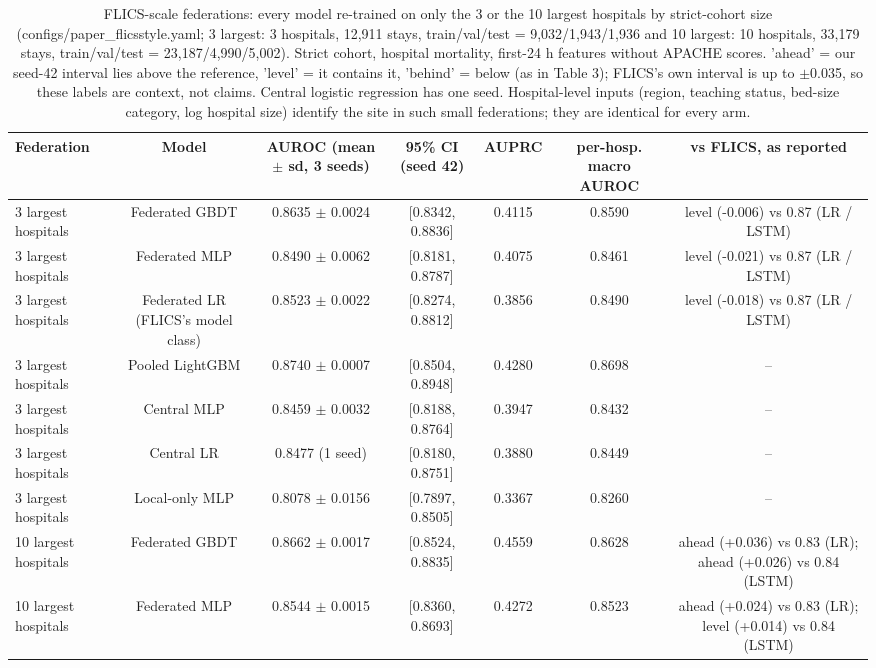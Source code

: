 \begin{table}[t]
\centering\small
\caption{FLICS-scale federations: every model re-trained on only the 3 or the 10 largest hospitals by strict-cohort size (configs/paper\_flicsstyle.yaml; 3 largest: 3 hospitals, 12,911 stays, train/val/test = 9,032/1,943/1,936 and 10 largest: 10 hospitals, 33,179 stays, train/val/test = 23,187/4,990/5,002). Strict cohort, hospital mortality, first-24 h features without APACHE scores. 'ahead' = our seed-42 interval lies above the reference, 'level' = it contains it, 'behind' = below (as in Table 3); FLICS's own interval is up to $\pm$0.035, so these labels are context, not claims. Central logistic regression has one seed. Hospital-level inputs (region, teaching status, bed-size category, log hospital size) identify the site in such small federations; they are identical for every arm.}\label{tab:flicsscale}
\begin{tabular}{lcccccc}
\toprule
Federation & Model & AUROC (mean $\pm$ sd, 3 seeds) & 95\% CI (seed 42) & AUPRC & per-hosp. macro AUROC & vs FLICS, as reported \\
\midrule
3 largest hospitals & Federated GBDT & 0.8635 $\pm$ 0.0024 & [0.8342, 0.8836] & 0.4115 & 0.8590 & level (-0.006) vs 0.87 (LR / LSTM) \\
3 largest hospitals & Federated MLP & 0.8490 $\pm$ 0.0062 & [0.8181, 0.8787] & 0.4075 & 0.8461 & level (-0.021) vs 0.87 (LR / LSTM) \\
3 largest hospitals & Federated LR (FLICS's model class) & 0.8523 $\pm$ 0.0022 & [0.8274, 0.8812] & 0.3856 & 0.8490 & level (-0.018) vs 0.87 (LR / LSTM) \\
3 largest hospitals & Pooled LightGBM & 0.8740 $\pm$ 0.0007 & [0.8504, 0.8948] & 0.4280 & 0.8698 & – \\
3 largest hospitals & Central MLP & 0.8459 $\pm$ 0.0032 & [0.8188, 0.8764] & 0.3947 & 0.8432 & – \\
3 largest hospitals & Central LR & 0.8477 (1 seed) & [0.8180, 0.8751] & 0.3880 & 0.8449 & – \\
3 largest hospitals & Local-only MLP & 0.8078 $\pm$ 0.0156 & [0.7897, 0.8505] & 0.3367 & 0.8260 & – \\
10 largest hospitals & Federated GBDT & 0.8662 $\pm$ 0.0017 & [0.8524, 0.8835] & 0.4559 & 0.8628 & ahead (+0.036) vs 0.83 (LR); ahead (+0.026) vs 0.84 (LSTM) \\
10 largest hospitals & Federated MLP & 0.8544 $\pm$ 0.0015 & [0.8360, 0.8693] & 0.4272 & 0.8523 & ahead (+0.024) vs 0.83 (LR); level (+0.014) vs 0.84 (LSTM) \\

\end{tabular}
\end{table}
